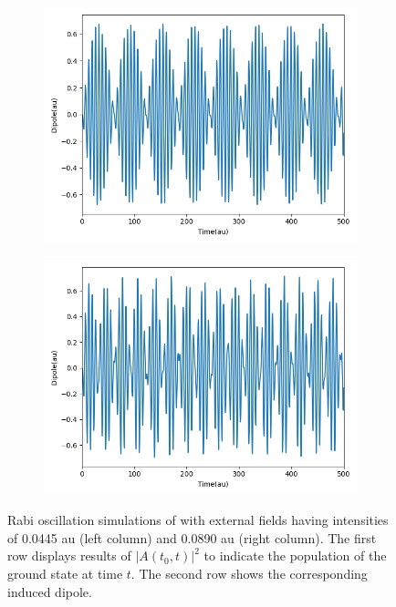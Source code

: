 \begin{figure}
\begin{subfigure}{0.47\textwidth}
         \includegraphics[width=\textwidth]{ch4/Figs/7-2.png}
     \end{subfigure}
     \hfill
     \begin{subfigure}{0.47\textwidth}
         \centering
         \includegraphics[width=\textwidth]{ch4/Figs/7-4.png}
     \end{subfigure}
     \caption{Rabi oscillation simulations of  with external fields having intensities of 0.0445 au (left column) and 0.0890 au (right column). The first row displays results of $|A(t_{0}, t)|^{2}$ to indicate the population of the ground state at time $t$. The second row shows the corresponding induced dipole.}
     \label{fig:h2-rabi}
\end{figure}

